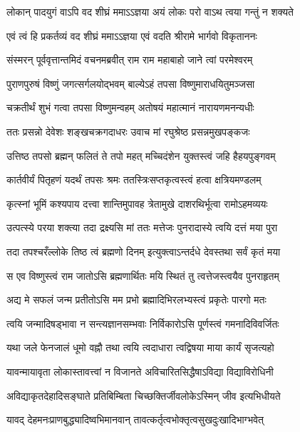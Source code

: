 \twolineshloka
{लोकान् पादयुगं वाऽपि वद शीघ्रं ममाऽऽज्ञया}
{अयं लोकः परो वाऽथ त्वया गन्तुं न शक्यते} %

\twolineshloka
{एवं त्वं हि प्रकर्तव्यं वद शीघ्रं ममाऽऽज्ञया}
{एवं वदति श्रीरामे भार्गवो विकृताननः} %

\twolineshloka
{संस्मरन् पूर्ववृत्तान्तमिदं वचनमब्रवीत्}
{राम राम महाबाहो जाने त्वां परमेश्वरम्} %

\twolineshloka
{पुराणपुरुषं विष्णुं जगत्सर्गलयोद्भवम्}
{बाल्येऽहं तपसा विष्णुमाराधयितुमञ्जसा} %

\twolineshloka
{चक्रतीर्थं शुभं गत्वा तपसा विष्णुमन्वहम्}
{अतोषयं महात्मानं नारायणमनन्यधीः} %

\twolineshloka
{ततः प्रसन्नो देवेशः शङ्खचक्रगदाधरः}
{उवाच मां रघुश्रेष्ठ प्रसन्नमुखपङ्कजः} %


\twolineshloka
{उत्तिष्ठ तपसो ब्रह्मन् फलितं ते तपो महत्}
{मच्चिदंशेन युक्तस्त्वं जहि हैहयपुङ्गवम्} %

\twolineshloka
{कार्तवीर्यं पितृहणं यदर्थं तपसः श्रमः}
{ततस्त्रिःसप्तकृत्वस्त्वं हत्वा क्षत्रियमण्डलम्} %

\twolineshloka
{कृत्स्नां भूमिं कश्यपाय दत्त्वा शान्तिमुपावह}
{त्रेतामुखे दाशरथिर्भूत्वा रामोऽहमव्ययः} %

\twolineshloka
{उत्पत्स्ये परया शक्त्या तदा द्रक्ष्यसि मां ततः}
{मत्तेजः पुनरादास्ये त्वयि दत्तं मया पुरा} %

\twolineshloka
{तदा तपश्चरँल्लोके तिष्ठ त्वं ब्रह्मणो दिनम्}
{इत्युक्त्वाऽन्तर्दधे देवस्तथा सर्वं कृतं मया} %

\twolineshloka
{स एव विष्णुस्त्वं राम जातोऽसि ब्रह्मणार्थितः}
{मयि स्थितं तु त्वत्तेजस्त्वयैव पुनराहृतम्} %

\twolineshloka
{अद्य मे सफलं जन्म प्रतीतोऽसि मम प्रभो}
{ब्रह्मादिभिरलभ्यस्त्वं प्रकृतेः पारगो मतः} %

\twolineshloka
{त्वयि जन्मादिषड्भावा न सन्त्यज्ञानसम्भवाः}
{निर्विकारोऽसि पूर्णस्त्वं गमनादिविवर्जितः} %

\twolineshloka
{यथा जले फेनजालं धूमो वह्नौ तथा त्वयि}
{त्वदाधारा त्वद्विषया माया कार्यं सृजत्यहो} %

\twolineshloka
{यावन्मायावृता लोकास्तावत्त्वां न विजानते}
{अविचारितसिद्धैषाऽविद्या विद्याविरोधिनी} %

\twolineshloka
{अविद्याकृतदेहादिसङ्घाते प्रतिबिम्बिता}
{चिच्छक्तिर्जीवलोकेऽस्मिन् जीव इत्यभिधीयते} %

\twolineshloka
{यावद् देहमनःप्राणबुद्ध्यादिष्वभिमानवान्}
{तावत्कर्तृत्वभोक्तृत्वसुखदुःखादिभाग्भवेत्} %

